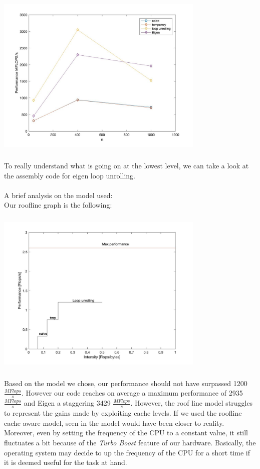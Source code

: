 \documentclass[11pt,a4paper,oneside,titlepage,openright]{book}
\begin{document}
\begin{center}
\includegraphics[width=10cm, height=8cm]{plotcolor}
\end{center}
To really understand what is going on at the lowest level, we can take a look at the assembly code for eigen loop unrolling.\\\\
A brief analysis on the model used:\\
Our roofline graph is the following: 
\begin{center}
\includegraphics[width=10cm, height=8cm]{fig_ok}
\end{center}
Based on the model we chose, our performance should not have surpassed 1200$\frac{MFlops}{s}$. However our code reaches on average a maximum performance of 2935 $\frac{MFlops}{s}$ and Eigen a staggering 3429 $\frac{MFlops}{s}$. 
However, the roof line model struggles to represent the gains made by exploiting cache levels. If we used the roofline cache aware model, seen in \cite{roofmdelcache} the model would have been closer to reality. 
Moreover, even by setting the frequency of the CPU to a constant value, it still fluctuates a bit because of the \textit{Turbo Boost} feature of our hardware. 
Basically, the operating system may decide to up the frequency of the CPU for a short time if it is deemed useful for the task at hand.
\end{document}
